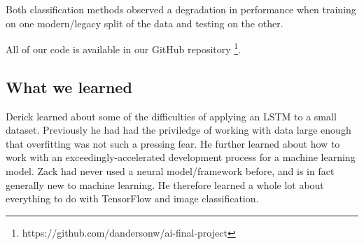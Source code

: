 \documentclass[letterpaper]{article} %
\begin{document}
Both classification methods observed a degradation in performance
when training on one modern/legacy split of the data and testing on the other.

All of our code is available in our GitHub repository
\footnote{https://github.com/dandersonw/ai-final-project}.

\subsection{What we learned}

Derick learned about some of the difficulties of applying
an LSTM to a small dataset.
Previously he had had the priviledge of working with data large enough
that overfitting was not such a pressing fear.
He further learned about how to work
with an exceedingly-accelerated development process
for a machine learning model.
Zack had never used a neural model/framework before,
and is in fact generally new to machine learning.
He therefore learned a whole lot
about everything to do with TensorFlow and image classification.




\end{document}

